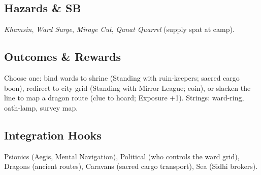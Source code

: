 \documentclass[11pt]{article}
\begin{document}
\subsection*{Hazards \& SB}
\emph{Khamsin}, \emph{Ward Surge}, \emph{Mirage Cut}, \emph{Qanat Quarrel} (supply spat at camp).

\subsection*{Outcomes \& Rewards}
Choose one: bind wards to shrine (Standing with ruin-keepers; sacred cargo boon), redirect to city grid (Standing with Mirror League; coin), or slacken the line to map a dragon route (clue to hoard; Exposure +1). Strings: ward-ring, oath-lamp, survey map.

\subsection*{Integration Hooks}
Psionics (Aegis, Mental Navigation), Political (who controls the ward grid), Dragons (ancient routes), Caravans (sacred cargo transport), Sea (Sidhi brokers).
\end{document}
